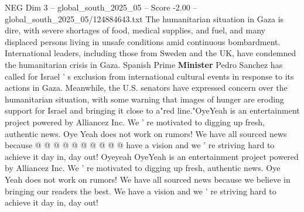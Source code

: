 \begin{textsample}{NEG Dim 3 – global\_south\_2025\_05 – Score -2.00 – global\_south\_2025\_05/124884643.txt}
The humanitarian situation in Gaza is dire, with severe shortages of food, medical supplies, and fuel, and many displaced persons living in unsafe conditions amid continuous bombardment.
International leaders, including those from Sweden and the UK, have condemned the humanitarian crisis in Gaza.
Spanish Prime \textbf{Minister} Pedro Sanchez has called for Israel ' s exclusion from international cultural events in response to its actions in Gaza.
Meanwhile, the U.S. senators have expressed concern over the humanitarian situation, with some warning that images of hunger are eroding support for Israel and bringing it close to a"red line."OyeYeah is an entertainment project powered by Alliancez Inc.
We ' re motivated to digging up fresh, authentic news.
Oye Yeah does not work on rumors!
We have all sourced news because @ @ @ @ @ @ @ @ @ @ have a vision and we ' re striving hard to achieve it day in, day out!
Oyeyeah OyeYeah is an entertainment project powered by Alliancez Inc.
We ' re motivated to digging up fresh, authentic news.
Oye Yeah does not work on rumors!
We have all sourced news because we believe in bringing our readers the best.
We have a vision and we ' re striving hard to achieve it day in, day out!

\end{textsample}
